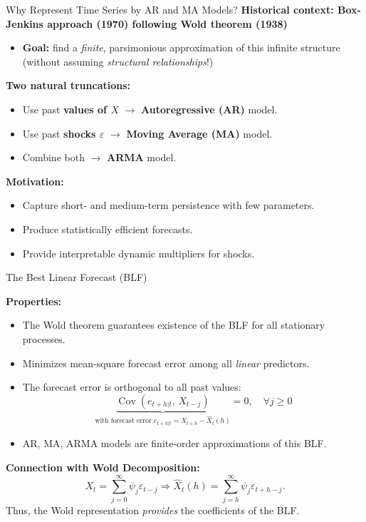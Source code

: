 \documentclass{beamer}
\begin{document}
\begin{frame}{Why Represent Time Series by AR and MA Models?}
\small
\textbf{Historical context: Box-Jenkins approach (1970) following Wold theorem (1938)}
\begin{itemize}
  \item \textbf{Goal:} find a \emph{finite}, parsimonious approximation of this infinite structure (without assuming \textit{structural relationships}!)
\end{itemize}

\pause
\textbf{Two natural truncations:}
\begin{itemize}
  \item Use past \textbf{values of $X$} $\rightarrow$ \textbf{Autoregressive (AR)} model.
  \item Use past \textbf{shocks $\varepsilon$} $\rightarrow$ \textbf{Moving Average (MA)} model.
  \item Combine both $\rightarrow$ \textbf{ARMA} model.
\end{itemize}

\pause
\textbf{Motivation:}
\begin{itemize}
  \item Capture short- and medium-term persistence with few parameters.
  \item Produce statistically efficient forecasts.
  \item Provide interpretable dynamic multipliers for shocks.
\end{itemize}

\end{frame}


\begin{frame}{The Best Linear Forecast (BLF)}

\textbf{Properties:}
\begin{itemize}
  \item The Wold theorem guarantees existence of the BLF for all stationary processes.
  \item Minimizes mean-square forecast error among all \emph{linear} predictors.
  \item The forecast error is orthogonal to all past values:
\[
\underbrace{\operatorname{Cov}(e_{t+h|t},\, X_{t-j})}_{\text{with forecast error } 
e_{t+h|t}=X_{t+h}-\hat{X}_t(h)} = 0, \quad \forall j \ge 0
\]
        \item AR, MA, ARMA models are finite-order approximations of this BLF.
\end{itemize}

\pause
\textbf{Connection with Wold Decomposition:}
\[
X_t = \sum_{j=0}^{\infty}\psi_j\varepsilon_{t-j}
\Rightarrow
\hat X_t(h) = \sum_{j=h}^{\infty}\psi_j\varepsilon_{t+h-j}.
\]
Thus, the Wold representation \emph{provides} the coefficients of the BLF.

\end{frame}
\end{document}
